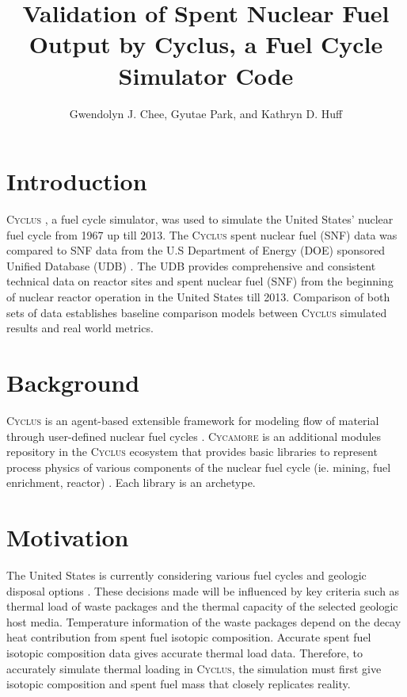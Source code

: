 \documentclass{anstrans}
\title{Validation of Spent Nuclear Fuel Output by Cyclus, a Fuel Cycle Simulator Code}
\author{Gwendolyn J. Chee, Gyutae Park, and Kathryn D. Huff}
\institute{
Dept. of Nuclear, Plasma and Radiological Engineering, University of Illinois at Urbana-Champaign \\
gchee2@illinois.edu
}
\newcommand{\Cyclus}{\textsc{Cyclus}\xspace}%
\newcommand{\Cycamore}{\textsc{Cycamore}\xspace}%
\begin{document}
\section{Introduction}
\Cyclus \cite{carlsen_cyclus_2014} , a fuel cycle simulator, was used to simulate the
United States' nuclear fuel cycle from 1967 up till 2013. The \Cyclus spent nuclear fuel (SNF) data was compared to SNF data from the U.S Department of Energy (DOE) sponsored Unified Database (UDB) \cite{peterson_unf-st&dards_2017}. The UDB provides comprehensive and consistent technical data on reactor sites and spent nuclear fuel (SNF) from the beginning of nuclear reactor operation in the United States till 2013. Comparison of both sets of data establishes baseline comparison models between \Cyclus simulated results and real world metrics. 

\section{Background}
\Cyclus is an agent-based extensible framework for modeling flow of material through user-defined nuclear fuel cycles \cite{huff_fundamental_2016}. \Cycamore \cite{carlsen_cycamore_2014} is an additional modules repository in the \Cyclus ecosystem that provides basic libraries to represent process physics of various components of the nuclear fuel cycle (ie. mining, fuel enrichment, reactor) \cite{huff_extensions_2014}. Each library is an archetype. 

\section{Motivation}
The United States is currently considering various fuel cycles and geologic disposal options
\cite{DOE_strategy_2013}. These decisions made will be influenced by key criteria such as thermal load of waste packages and the thermal capacity of the selected geologic host media. Temperature information of the waste packages depend on the decay heat contribution from spent fuel isotopic composition. Accurate spent fuel isotopic composition data gives accurate thermal load data. Therefore, to accurately simulate thermal loading in \Cyclus, the simulation must first give isotopic composition and spent fuel mass that closely replicates reality. 

\end{document}
